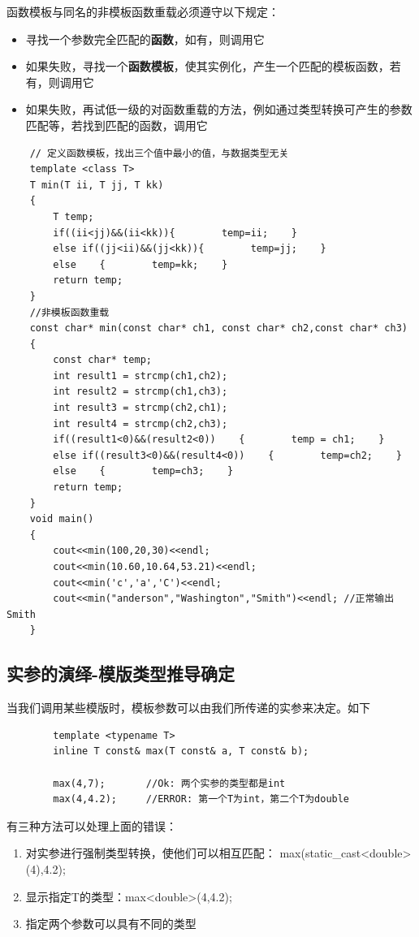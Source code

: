 \documentclass[UTF8,a4paper,12pt]{ctexbook}
\begin{document}
		函数模板与同名的非模板函数重载必须遵守以下规定：
		\begin{itemize}[itemindent = 1em]
			\item 寻找一个参数完全匹配的\textbf{函数}，如有，则调用它
			\item 如果失败，寻找一个\textbf{函数模板}，使其实例化，产生一个匹配的模板函数，若有，则调用它
			\item 如果失败，再试低一级的对函数重载的方法，例如通过类型转换可产生的参数匹配等，若找到匹配的函数，调用它
		\end{itemize}
	\begin{lstlisting}
	// 定义函数模板，找出三个值中最小的值，与数据类型无关 
	template <class T> 
	T min(T ii, T jj, T kk) 
	{ 
		T temp; 
		if((ii<jj)&&(ii<kk)){        temp=ii;    } 
		else if((jj<ii)&&(jj<kk)){        temp=jj;    } 
		else    {        temp=kk;    } 
		return temp; 
	} 
	//非模板函数重载 
	const char* min(const char* ch1, const char* ch2,const char* ch3) 
	{ 
		const char* temp; 
		int result1 = strcmp(ch1,ch2); 
		int result2 = strcmp(ch1,ch3); 
		int result3 = strcmp(ch2,ch1); 
		int result4 = strcmp(ch2,ch3); 
		if((result1<0)&&(result2<0))    {        temp = ch1;    } 
		else if((result3<0)&&(result4<0))    {        temp=ch2;    } 
		else    {        temp=ch3;    } 
		return temp; 
	} 
	void main() 
	{ 
		cout<<min(100,20,30)<<endl; 
		cout<<min(10.60,10.64,53.21)<<endl; 
		cout<<min('c','a','C')<<endl;     
		cout<<min("anderson","Washington","Smith")<<endl; //正常输出 Smith
	} 	
	\end{lstlisting}
	
	\subsection{实参的演绎-模版类型推导确定}
		
		当我们调用某些模版时，模板参数可以由我们所传递的实参来决定。如下
	\begin{lstlisting}
		template <typename T>
		inline T const& max(T const& a, T const& b);
		
		max(4,7);		//Ok: 两个实参的类型都是int
		max(4,4.2);		//ERROR: 第一个T为int，第二个T为double
	\end{lstlisting}
	
	有三种方法可以处理上面的错误：
	\begin{enumerate}[itemindent = 1em]
		\item 对实参进行强制类型转换，使他们可以相互匹配： max(static\_cast<double>(4),4.2);
		\item 显示指定T的类型：max<double>(4,4.2); 
		\item 指定两个参数可以具有不同的类型
	\end{enumerate}
\end{document}
